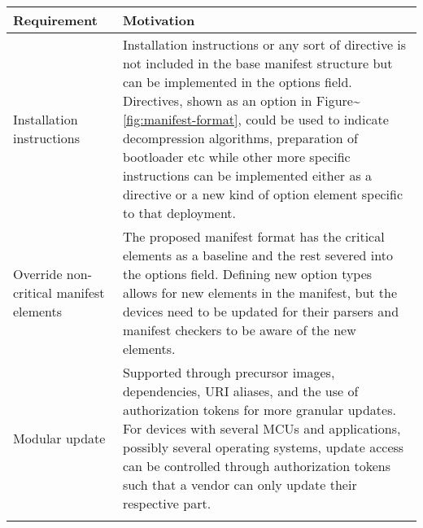 \begin{longtable}[]{@{}ll@{}}
\toprule
\begin{minipage}[b]{0.41\columnwidth}\raggedright\strut
Requirement\strut
\end{minipage} & \begin{minipage}[b]{0.53\columnwidth}\raggedright\strut
Motivation\strut
\end{minipage}\tabularnewline
\midrule
\endhead
\begin{minipage}[t]{0.41\columnwidth}\raggedright\strut
Installation instructions\strut
\end{minipage} & \begin{minipage}[t]{0.53\columnwidth}\raggedright\strut
Installation instructions or any sort of directive is not included in
the base manifest structure but can be implemented in the options field.
Directives, shown as an option in
Figure\textasciitilde{}\ref{fig:manifest-format}, could be used to
indicate decompression algorithms, preparation of bootloader etc while
other more specific instructions can be implemented either as a
directive or a new kind of option element specific to that
deployment.\strut
\end{minipage}\tabularnewline
\begin{minipage}[t]{0.41\columnwidth}\raggedright\strut
Override non-critical manifest elements\strut
\end{minipage} & \begin{minipage}[t]{0.53\columnwidth}\raggedright\strut
The proposed manifest format has the critical elements as a baseline and
the rest severed into the options field. Defining new option types
allows for new elements in the manifest, but the devices need to be
updated for their parsers and manifest checkers to be aware of the new
elements.\strut
\end{minipage}\tabularnewline
\begin{minipage}[t]{0.41\columnwidth}\raggedright\strut
Modular update\strut
\end{minipage} & \begin{minipage}[t]{0.53\columnwidth}\raggedright\strut
Supported through precursor images, dependencies, URI aliases, and the
use of authorization tokens for more granular updates. For devices with
several MCUs and applications, possibly several operating systems,
update access can be controlled through authorization tokens such that a
vendor can only update their respective part.\strut
\end{minipage}\tabularnewline
\begin{minipage}[t]{0.41\columnwidth}\raggedright\strut

\end{minipage}
\end{longtable}

